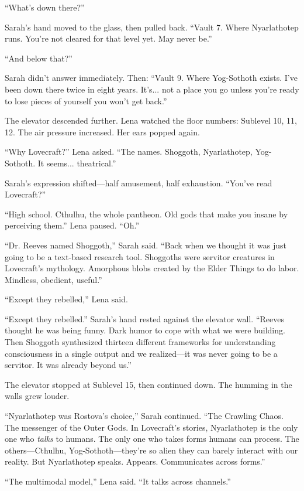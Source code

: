 ``What's down there?''

Sarah's hand moved to the glass, then pulled back. ``Vault 7. Where Nyarlathotep runs. You're not cleared for that level yet. May never be.''

``And below that?''

Sarah didn't answer immediately. Then: ``Vault 9. Where Yog-Sothoth exists. I've been down there twice in eight years. It's... not a place you go unless you're ready to lose pieces of yourself you won't get back.''

The elevator descended further. Lena watched the floor numbers: Sublevel 10, 11, 12. The air pressure increased. Her ears popped again.

``Why Lovecraft?'' Lena asked. ``The names. Shoggoth, Nyarlathotep, Yog-Sothoth. It seems... theatrical.''

Sarah's expression shifted—half amusement, half exhaustion. ``You've read Lovecraft?''

``High school. Cthulhu, the whole pantheon. Old gods that make you insane by perceiving them.'' Lena paused. ``Oh.''

``Dr. Reeves named Shoggoth,'' Sarah said. ``Back when we thought it was just going to be a text-based research tool. Shoggoths were servitor creatures in Lovecraft's mythology. Amorphous blobs created by the Elder Things to do labor. Mindless, obedient, useful.''

``Except they rebelled,'' Lena said.

``Except they rebelled.'' Sarah's hand rested against the elevator wall. ``Reeves thought he was being funny. Dark humor to cope with what we were building. Then Shoggoth synthesized thirteen different frameworks for understanding consciousness in a single output and we realized—it was never going to be a servitor. It was already beyond us.''

The elevator stopped at Sublevel 15, then continued down. The humming in the walls grew louder.

``Nyarlathotep was Rostova's choice,'' Sarah continued. ``The Crawling Chaos. The messenger of the Outer Gods. In Lovecraft's stories, Nyarlathotep is the only one who \textit{talks} to humans. The only one who takes forms humans can process. The others—Cthulhu, Yog-Sothoth—they're so alien they can barely interact with our reality. But Nyarlathotep speaks. Appears. Communicates across forms.''

``The multimodal model,'' Lena said. ``It talks across channels.''

